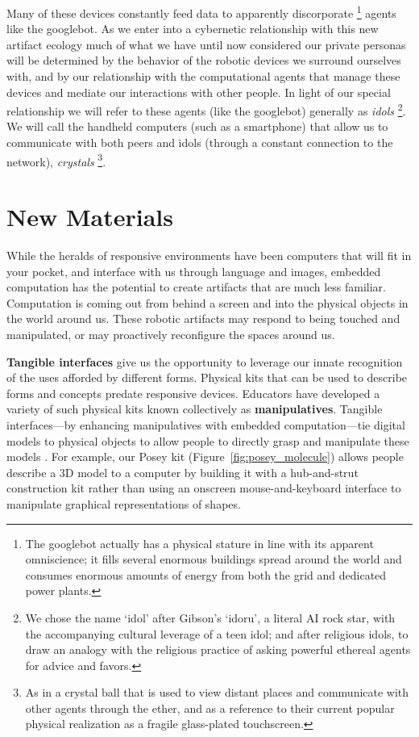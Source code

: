 Many of these devices constantly feed data to apparently discorporate%
\footnote{The googlebot actually has a physical stature in line with its apparent omniscience; it fills several enormous buildings spread around the world and consumes enormous amounts of energy from both the grid and dedicated power plants.}
agents like the googlebot.
As we enter into a cybernetic relationship with this new artifact ecology much of what we have until now considered our private personas will be determined by the behavior of the robotic devices we surround ourselves with, and by our relationship with the computational agents that manage these devices and mediate our interactions with other people. 
In light of our special relationship we will refer to these agents (like the googlebot) generally as \emph{idols}%
\footnote{We chose the name `idol' after Gibson's `idoru'\citeyearpar{gibson_idoru}, a literal AI rock star, with the accompanying cultural leverage of a teen idol; and after religious idols, to draw an analogy with the religious practice of asking powerful ethereal agents for advice and favors.}.
We will call the handheld computers (such as a smartphone) that allow us to communicate with both peers and idols (through a constant connection to the network), \emph{crystals}%
\footnote{As in a crystal ball that is used to view distant places and communicate with other agents through the ether, and as a reference to their current popular physical realization as a fragile glass-plated touchscreen.}.

\section{New Materials}
%
While the heralds of responsive environments have been computers that will fit in your pocket, and interface with us through language and images, embedded computation has the potential to create artifacts that are much less familiar.
Computation is coming out from behind a screen and into the physical objects in the world around us. These robotic artifacts may respond to being touched and manipulated, or may proactively reconfigure the spaces around us.

\textbf{Tangible interfaces} give us the opportunity to leverage our innate recognition of the uses afforded by different forms. 
Physical kits that can be used to describe forms and concepts predate responsive devices. Educators have developed a variety of such physical kits known collectively as \textbf{manipulatives}. 
Tangible interfaces---by enhancing manipulatives with embedded computation---tie digital models to physical objects to allow people to directly grasp and manipulate these models \citep{tangible_bits}.
For example, our Posey kit (Figure~\ref{fig:posey_molecule}) allows people describe a 3D model to a computer by building it with a hub-and-strut construction kit rather than using an onscreen mouse-and-keyboard interface to manipulate graphical representations of shapes.

